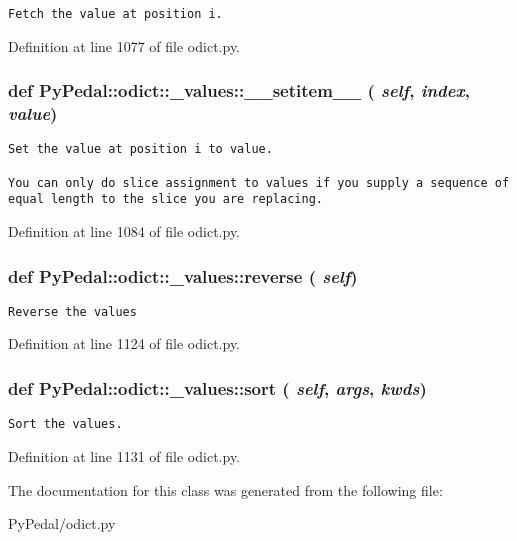 \footnotesize\begin{verbatim}Fetch the value at position i.\end{verbatim}
\normalsize
 

Definition at line 1077 of file odict.py.\hypertarget{classPyPedal_1_1odict_1_1__values_ffbc3fb75642a48ccb12341abcac5755}{
\subsubsection{\setlength{\rightskip}{0pt plus 5cm}def PyPedal::odict::\_\-values::\_\-\_\-setitem\_\-\_\- ( {\em self}, \/   {\em index}, \/   {\em value})}}
\label{classPyPedal_1_1odict_1_1__values_ffbc3fb75642a48ccb12341abcac5755}




\footnotesize\begin{verbatim}
Set the value at position i to value.

You can only do slice assignment to values if you supply a sequence of
equal length to the slice you are replacing.
\end{verbatim}
\normalsize
 

Definition at line 1084 of file odict.py.\hypertarget{classPyPedal_1_1odict_1_1__values_233fab7141cc0c993560259d843bc10b}{
\subsubsection{\setlength{\rightskip}{0pt plus 5cm}def PyPedal::odict::\_\-values::reverse ( {\em self})}}
\label{classPyPedal_1_1odict_1_1__values_233fab7141cc0c993560259d843bc10b}




\footnotesize\begin{verbatim}Reverse the values\end{verbatim}
\normalsize
 

Definition at line 1124 of file odict.py.\hypertarget{classPyPedal_1_1odict_1_1__values_30257eba0137e47560846e2243e721c6}{
\subsubsection{\setlength{\rightskip}{0pt plus 5cm}def PyPedal::odict::\_\-values::sort ( {\em self}, \/   {\em args}, \/   {\em kwds})}}
\label{classPyPedal_1_1odict_1_1__values_30257eba0137e47560846e2243e721c6}




\footnotesize\begin{verbatim}Sort the values.\end{verbatim}
\normalsize
 

Definition at line 1131 of file odict.py.

The documentation for this class was generated from the following file:\begin{CompactItemize}
\item 
PyPedal/odict.py\end{CompactItemize}
